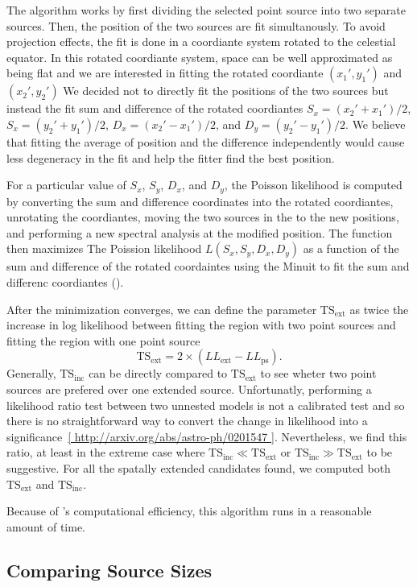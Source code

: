 \documentclass[preprint]{aastex}
\newcommand{\tsext}{{\ensuremath{\text{TS}_\text{ext}}}\xspace}
\newcommand{\tsinc}{\ensuremath{\text{TS}_\text{inc}}\xspace}
\newcommand{\pointlike}{\text{\em pointlike}\xspace}
\begin{document}
The algorithm works by first dividing the selected point source into
two separate sources. Then, the position of the two sources 
are fit simultanously. To avoid projection effects, the fit is
done in a coordiante system rotated to the celestial equator.
In this rotated coordiante system, space can be well approximated
as being flat and we are interested in fitting the 
rotated coordiante $(x_1',y_1')$ and $(x_2',y_2')$
We decided not to directly fit the positions of the two sources 
but instead the fit sum and difference of the rotated coordiantes
$S_x=(x_2'+x_1')/2$, $S_x=(y_2'+y_1')/2$, $D_x=(x_2'-x_1')/2$, and $D_y=(y_2'-y_1')/2$.
We believe that fitting the average of position and the difference
independently would cause less degeneracy in the fit and help the fitter
find the best position.

For a particular value of $S_x$, $S_y$, $D_x$, and $D_y$, the Poisson
likelihood is computed by converting the sum and difference coordinates
into the rotated coordiantes, unrotating the coordiantes, moving the
two sources in the \pointlike to the new positions, and performing a new
spectral analysis at the modified position.  The function then maximizes
The Poission likelihood $L(S_x,S_y,D_x,D_y)$ as a function of the sum
and difference of the rotated coordaintes using the Minuit to fit the
sum and differenc coordiantes (\cite{minuit_documentation}).

After the minimization converges, we can define the parameter $\tsext$
as twice the increase in log likelihood between fitting the region with
two point sources and fitting the region with one point source
\begin{equation}
  \tsext=2\times(LL_\text{ext}-LL_\text{ps}).
\end{equation}
Generally, \tsinc can be directly compared to \tsext to see wheter two
point sources are prefered over one extended source. Unfortunatly,
performing a likelihood ratio test between two unnested models
is not a calibrated test and so there is no straightforward way
to convert the change in likelihood into a significance~\ref{
http://arxiv.org/abs/astro-ph/0201547 }. Nevertheless, we find this
ratio, at least in the extreme case where $\tsinc \ll \tsext$ or
$\tsinc\gg\tsext$ to be suggestive. For all the spatally extended
candidates found, we computed both \tsext and \tsinc.

Because of \pointlike's computational efficiency, this algorithm
runs in a reasonable amount of time.

\subsection{Comparing Source Sizes}
\end{document}
